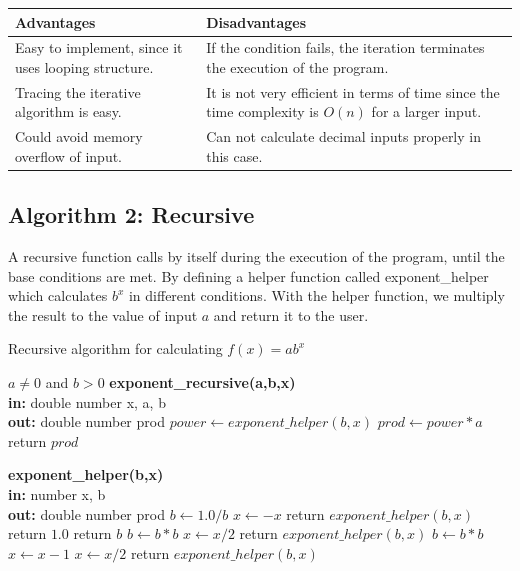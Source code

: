 \documentclass[11pt]{article}
\begin{document}
\begin{center}
\begin{tabular}{|p{7cm}|p{7cm}|}
\hline
     \textbf{Advantages} & \textbf{Disadvantages}\\ \hline
     Easy to implement, since it uses looping structure. & If the condition fails, the iteration terminates the execution of the program.\\ \hline
     Tracing the iterative algorithm is easy. & It is not very efficient in terms of time since the time complexity is $O(n)$ for a larger input\cite{xu2015application}. \\ \hline
     Could avoid memory overflow of input. & Can not calculate decimal inputs properly in this case.\\ \hline
\end{tabular}
\end{center}

\subsection{Algorithm 2: Recursive}
A recursive function calls by itself during the execution of the program, until the base conditions are met\cite{haberman2002case}. By defining a helper function called exponent\_helper which calculates $b^x$ in different conditions. With the helper function, we multiply the result to the value of input $a$ and return it to the user.

\begin{algorithm}
  \caption{Recursive algorithm for calculating $f(x) = ab^x$}
  \begin{algorithmic}[1]
  \Require $a \neq 0$ and $b > 0$ 
   \Function\textbf{\textbf{exponent\_recursive(a,b,x)}}\\
    \textbf{in: }double number x, a, b\\
    \textbf{out: }double number prod
    \State $power \gets exponent\_helper(b,x)$
    \State $prod \gets power * a$
    \State return $prod$
    \EndFunction
  \end{algorithmic}
\end{algorithm}

\begin{algorithm}
  \begin{algorithmic}[1]
   \Function\textbf{\textbf{exponent\_helper(b,x)}}\\
   \textbf{in: }number x, b\\
   \textbf{out: }double number prod
   \State $b \gets 1.0 / b$
   \State $x \gets -x$ 
   \State return $exponent\_helper(b, x)$ 
     \State return $1.0$
    \State return $b$
    \State $b \gets b * b$ 
    \State $x \gets x / 2$ 
    \State return $exponent\_helper(b, x)$
    \Else
    \State $b \gets b * b$ 
    \State $x \gets x - 1$ 
    \State $x \gets x / 2$ 
    \State return $exponent\_helper(b, x)$
    \EndIf 
   \EndFunction
  \end{algorithmic}
\end{algorithm}
\end{document}
